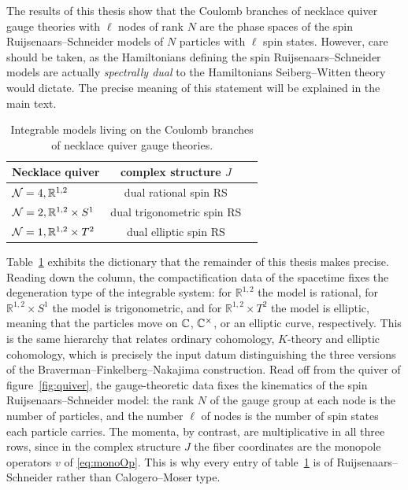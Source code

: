 The results of this thesis show that the Coulomb branches of necklace quiver gauge theories with $\ell$ nodes of rank $N$ are the phase spaces of the spin Ruijsenaars--Schneider models of $N$ particles with $\ell$ spin states. However, care should be taken, as the Hamiltonians defining the spin Ruijsenaars--Schneider models are actually \emph{spectrally dual} to the Hamiltonians Seiberg--Witten theory would dictate. The precise meaning of this statement will be explained in the main text.
\begin{table}[h]
	\centering
	\begin{tabular}{|l|c|c|}
		\hline
		Necklace quiver & complex structure $J$ \\
		\hline
		$\mathcal{N}=4, \mathbb{R}^{1,2}$ & dual rational spin RS \\
		$\mathcal{N}=2, \mathbb{R}^{1,2} \times S^1$ & dual trigonometric spin RS \\
		$\mathcal{N}=1, \mathbb{R}^{1,2} \times T^2$ & dual elliptic spin RS \\ \hline
\end{tabular}
	\caption[Coulomb branches of necklace quiver gauge theories]{Integrable models living on the Coulomb branches of necklace quiver gauge theories.\label{table:intSysNecklace}}
\end{table}

Table~\ref{table:intSysNecklace} exhibits the dictionary that the remainder of this thesis makes precise. Reading down the column, the compactification data of the spacetime fixes the degeneration type of the integrable system: for $\mathbb{R}^{1,2}$ the model is rational, for $\mathbb{R}^{1,2}\times S^1$ the model is trigonometric, and for $\mathbb{R}^{1,2} \times T^2$ the model is elliptic, meaning that the particles move on $\mathbb{C}$, $\mathbb{C}^\times$, or an elliptic curve, respectively. This is the same hierarchy that relates ordinary cohomology, $K$-theory and elliptic cohomology, which is precisely the input datum distinguishing the three versions of the Braverman--Finkelberg--Nakajima construction. Read off from the quiver of figure~\ref{fig:quiver}, the gauge-theoretic data fixes the kinematics of the spin Ruijsenaars--Schneider model: the rank $N$ of the gauge group at each node is the number of particles, and the number $\ell$ of nodes is the number of spin states each particle carries. The momenta, by contrast, are multiplicative in all three rows, since in the complex structure $J$ the fiber coordinates are the monopole operators $v$ of \eqref{eq:monoOp}. This is why every entry of table~\ref{table:intSysNecklace} is of Ruijsenaars--Schneider rather than Calogero--Moser type.

